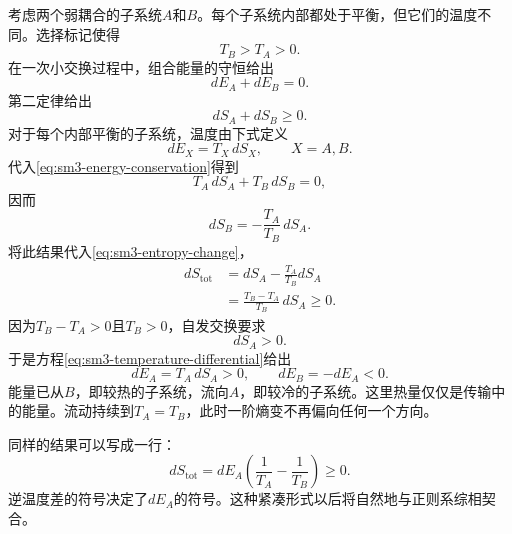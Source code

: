 考虑两个弱耦合的子系统\(A\)和\(B\)。每个子系统内部都处于平衡，但它们的温度不同。选择标记使得
\begin{equation}
 T_B>T_A>0.
 \label{eq:sm3-temperature-order}
\end{equation}
在一次小交换过程中，组合能量的守恒给出
\begin{equation}
 dE_A+dE_B=0.
 \label{eq:sm3-energy-conservation}
\end{equation}
第二定律给出
\begin{equation}
 dS_A+dS_B\geq0.
 \label{eq:sm3-entropy-change}
\end{equation}
对于每个内部平衡的子系统，温度由下式定义
\begin{equation}
 dE_X=T_X\,dS_X,
 \qquad X=A,B.
 \label{eq:sm3-temperature-differential}
\end{equation}
代入\eqref{eq:sm3-energy-conservation}得到
\begin{equation}
 T_A\,dS_A+T_B\,dS_B=0,
\end{equation}
因而
\begin{equation}
 dS_B=-\frac{T_A}{T_B}\,dS_A.
 \label{eq:sm3-dsb}
\end{equation}
将此结果代入\eqref{eq:sm3-entropy-change}，
\begin{align}
 dS_{\mathrm{tot}}
 &=dS_A-\frac{T_A}{T_B}dS_A\\
 &=\frac{T_B-T_A}{T_B}\,dS_A\geq0.
 \label{eq:sm3-flow-entropy}
\end{align}
因为\(T_B-T_A>0\)且\(T_B>0\)，自发交换要求
\[
 dS_A>0.
\]
于是方程\eqref{eq:sm3-temperature-differential}给出
\begin{equation}
 dE_A=T_A\,dS_A>0,
 \qquad
 dE_B=-dE_A<0.
 \label{eq:sm3-hot-to-cold}
\end{equation}
能量已从\(B\)，即较热的子系统，流向\(A\)，即较冷的子系统。这里热量仅仅是传输中的能量。流动持续到\(T_A=T_B\)，此时一阶熵变不再偏向任何一个方向。

同样的结果可以写成一行：
\begin{equation}
 dS_{\mathrm{tot}}
 =dE_A\left(\frac{1}{T_A}-\frac{1}{T_B}\right)\geq0.
 \label{eq:sm3-compact-flow}
\end{equation}
逆温度差的符号决定了\(dE_A\)的符号。这种紧凑形式以后将自然地与正则系综相契合。

\begin{classroomqa}
\end{classroomqa}

